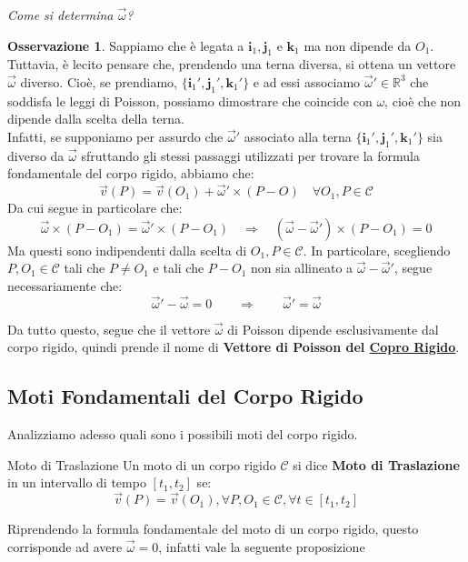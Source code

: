 \documentclass[11pt,a4paper,twoside]{article}
\theoremstyle{definition}
\newtheorem*{oss}{Osservazione}
\begin{document}
\textit{Come si determina $\vec \omega$?}
\begin{oss}
	Sappiamo che è legata a $\mathbf i_1, \mathbf j_1$ e $\mathbf k_1$ ma non dipende da $O_1$. Tuttavia, è lecito pensare che, prendendo una terna diversa, si ottena un vettore $\vec \omega$ diverso. Cioè, se prendiamo, $\{\mathbf i_1', \mathbf j_1', \mathbf k_1'\}$ e ad essi associamo $\vec \omega' \in \mathbb R^3$ che soddisfa le leggi di Poisson, possiamo dimostrare che coincide con $\omega$, cioè che non dipende dalla scelta della terna.\\
	Infatti, se supponiamo per assurdo che $\vec\omega'$ associato alla terna $\{\mathbf i_1', \mathbf j_1', \mathbf k_1'\}$ sia diverso da $\vec \omega$ sfruttando gli stessi passaggi utilizzati per trovare la formula fondamentale del corpo rigido, abbiamo che:
	\[ \vec v(P) = \vec v(O_1) + \vec \omega' \times (P-O)\quad \forall O_1, P \in \mathscr C \]
	Da cui segue in particolare che:
	\[ \vec \omega \times (P-O_1) = \vec \omega' \times (P-O_1)\quad \Rightarrow \quad (\vec \omega - \vec \omega') \times (P-O_1) = 0\]
	Ma questi sono indipendenti dalla scelta di $O_1, P \in \mathscr C$. In particolare, scegliendo $P,O_1 \in \mathscr C$ tali che $P \neq O_1$ e tali che $P-O_1$ non sia allineato a $\vec \omega - \vec \omega'$, segue necessariamente che:
	\[ \vec \omega' - \vec \omega = 0\qquad \Rightarrow \qquad \vec \omega' = \vec \omega \]
\end{oss}

Da tutto questo, segue che il vettore $\vec \omega$ di Poisson dipende esclusivamente dal corpo rigido, quindi prende il nome di \textbf{Vettore di Poisson del \underline{Copro Rigido}}.

\subsection{Moti Fondamentali del Corpo Rigido}

Analizziamo adesso quali sono i possibili moti del corpo rigido.

\begin{defn}{Moto di Traslazione}{}
	Un moto di un corpo rigido $\mathscr C$ si dice \textbf{Moto di Traslazione} in un intervallo di tempo $[t_1,t_2]$ se:
	\[ \vec v(P) = \vec v(O_1), \forall P,O_1 \in \mathscr C, \forall t \in [t_1,t_2] \]
\end{defn}

Riprendendo la formula fondamentale del moto di un corpo rigido, questo corrisponde ad avere $\vec \omega  =0$, infatti vale la seguente proposizione
\end{document}

